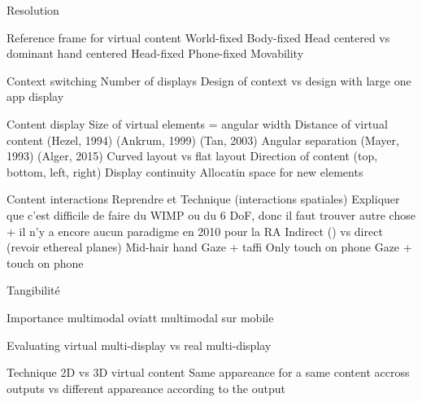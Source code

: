         Resolution

        Reference frame for virtual content 
            World-fixed \cite{EnsFinneganIrani2014} 
            Body-fixed \cite{EnsFinneganIrani2014} 
                Head centered vs dominant hand centered 
            Head-fixed \cite{EnsFinneganIrani2014} 
            Phone-fixed
            Movability \cite{EnsHincapie-RamosIrani2014}

        Context switching 
            Number of displays \cite{RashidNacentaQuigley2012} \cite{CauchardLoechtefeldFraserEtAl2012}
            Design of context vs design with large one app display \cite{BallNorth2008}

        Content display
            Size of virtual elements = angular width \cite{ShuppBallYostEtAl2006} \cite{BallNorth2008}
            Distance of virtual content (Hezel, 1994) (Ankrum, 1999) (Tan, 2003) \cite{ChanKaoChenEtAl2010} \cite{EnsFinneganIrani2014} 
            Angular separation (Mayer, 1993) \cite{EnsFinneganIrani2014} \cite{KishishitaKiyokawaOrloskyEtAl2014} (Alger, 2015) 
            Curved layout vs flat layout \cite{ShuppBallYostEtAl2006} 
            Direction of content (top, bottom, left, right) \cite{EnsFinneganIrani2014} 
            Display continuity \cite{TanCzerwinski2003} \cite{RashidNacentaQuigley2012}
            Allocatin space for new elements \cite{BellFeiner2000}

        Content interactions
        	Reprendre \cite{Bernatchez2008} et \cite{JankowskiHachet2013}
        	Technique (interactions spatiales)
	        	Expliquer que c'est difficile de faire du WIMP ou du 6 DoF, donc il faut trouver autre chose \citet{AzumaBaillotBehringerEtAl2001} + il n'y a encore aucun paradigme en 2010 pour la RA \cite{VanKrevelenPoelman2010}
	        	Indirect (\cite{TeatherStuerzlinger2011}) vs direct (revoir ethereal planes)
	            Mid-hair hand \cite{EnsFinneganIrani2014} \cite{ChanKaoChenEtAl2010} \cite{JonesSodhiForsythEtAl2012}
	            Gaze + taffi 
	            Only touch on phone 
	            Gaze + touch on phone

	        Tangibilité

            Importance multimodal oviatt \cite{Oviatt2003}
            multimodal sur mobile \cite{HuerstVanWezel2011}

        Evaluating virtual multi-display vs real multi-display 

        Technique 
            2D vs 3D virtual content \cite{JansenDragicevicFekete2013} \cite{SerranoHildebrandtSubramanianEtAl2014}
            Same appareance for a same content accross outputs vs different appareance according to the output \cite{GrubertHeinischQuigleyEtAl2015} 


